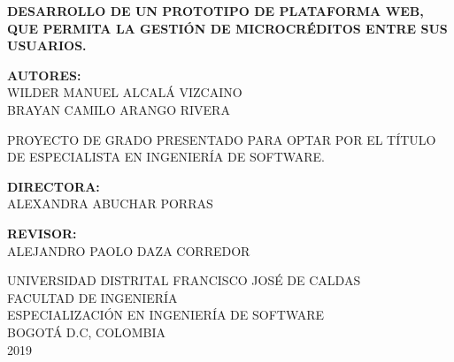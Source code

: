 \begin{titlepage}
	\begin{center}
	\textbf{DESARROLLO DE UN PROTOTIPO DE PLATAFORMA WEB, QUE PERMITA LA GESTIÓN DE MICROCRÉDITOS ENTRE SUS USUARIOS.}\\
	\vspace{2.5cm}
	
	\textbf{AUTORES:}\\
	{WILDER MANUEL ALCALÁ VIZCAINO}\\
	{BRAYAN CAMILO ARANGO RIVERA}\\ 
	\vspace{2.5cm}
	
	{PROYECTO DE GRADO PRESENTADO PARA OPTAR POR EL TÍTULO DE ESPECIALISTA EN INGENIERÍA DE SOFTWARE.}\\
	\vspace{2.5cm}
	
	\textbf{DIRECTORA:}\\
	{ALEXANDRA ABUCHAR PORRAS}\\
	\vspace{1cm}
	
	\textbf{REVISOR:}\\
	{ALEJANDRO PAOLO DAZA CORREDOR}\\
	\vspace{2cm}
	

	
	
	{UNIVERSIDAD DISTRITAL FRANCISCO JOSÉ DE CALDAS}\\
	{FACULTAD DE INGENIERÍA}\\
	{ESPECIALIZACIÓN EN INGENIERÍA DE SOFTWARE}\\
	{BOGOTÁ D.C, COLOMBIA}\\
	{2019}\\
	\end{center}
\end{titlepage}